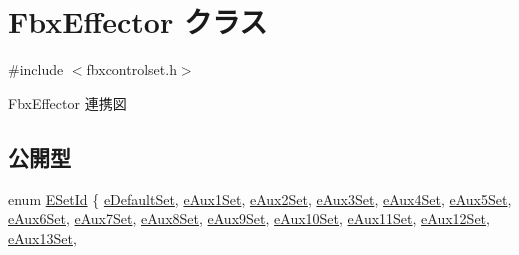 \hypertarget{class_fbx_effector}{}\section{Fbx\+Effector クラス}
\label{class_fbx_effector}


{\ttfamily \#include $<$fbxcontrolset.\+h$>$}



Fbx\+Effector 連携図
\subsection*{公開型}
\begin{DoxyCompactItemize}
\item 
enum \hyperlink{class_fbx_effector_a49240bdb189340c6969df38067ee4811}{E\+Set\+Id} \{ \newline
\hyperlink{class_fbx_effector_a49240bdb189340c6969df38067ee4811a00d87d17088597ac3285607cc0a39ac1}{e\+Default\+Set}, 
\hyperlink{class_fbx_effector_a49240bdb189340c6969df38067ee4811aa1655dcb8be739654364c1e936419873}{e\+Aux1\+Set}, 
\hyperlink{class_fbx_effector_a49240bdb189340c6969df38067ee4811ae28cd00d92ee1369774b81642af67489}{e\+Aux2\+Set}, 
\hyperlink{class_fbx_effector_a49240bdb189340c6969df38067ee4811a08f5422aa21b7e5f34be655ebe44e258}{e\+Aux3\+Set}, 
\newline
\hyperlink{class_fbx_effector_a49240bdb189340c6969df38067ee4811a3340a31863e842713084ae1151c25009}{e\+Aux4\+Set}, 
\hyperlink{class_fbx_effector_a49240bdb189340c6969df38067ee4811a62c78f1c64f55e29de5949b1c366387f}{e\+Aux5\+Set}, 
\hyperlink{class_fbx_effector_a49240bdb189340c6969df38067ee4811af31bf9fd422a29b05d5afa029be99f77}{e\+Aux6\+Set}, 
\hyperlink{class_fbx_effector_a49240bdb189340c6969df38067ee4811ae3bcb08c54f5e4c81a9102debe75cc51}{e\+Aux7\+Set}, 
\newline
\hyperlink{class_fbx_effector_a49240bdb189340c6969df38067ee4811ac48b23c15bc8a74edbc74593aaa749c0}{e\+Aux8\+Set}, 
\hyperlink{class_fbx_effector_a49240bdb189340c6969df38067ee4811a58f0506d8cdfb1706a1522cd6c387dd3}{e\+Aux9\+Set}, 
\hyperlink{class_fbx_effector_a49240bdb189340c6969df38067ee4811a78f8ce9189c575256d5a511a344e50da}{e\+Aux10\+Set}, 
\hyperlink{class_fbx_effector_a49240bdb189340c6969df38067ee4811ab3dfbf8c7524d81d3cddb6c0cb9bb4ac}{e\+Aux11\+Set}, 
\newline
\hyperlink{class_fbx_effector_a49240bdb189340c6969df38067ee4811ad2e3cee52756295e2e9f3029d75325ef}{e\+Aux12\+Set}, 
\hyperlink{class_fbx_effector_a49240bdb189340c6969df38067ee4811ab9788d1faa84ed59e3038a0c0f56c277}{e\+Aux13\+Set}, 

\end{DoxyCompactItemize}
